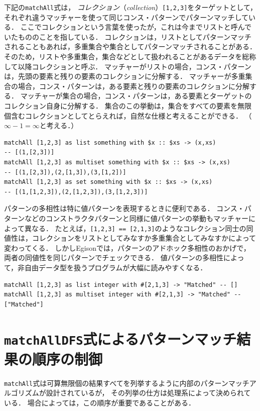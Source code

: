 下記の\lstinline{matchAll}式は， \emph{コレクション}（\emph{collection}）\lstinline{[1,2,3]}をターゲットとして，それぞれ違うマッチャーを使って同じコンス・パターンでパターンマッチしている．
ここでコレクションという言葉を使ったが，これは今までリストと呼んでいたもののことを指している．
コレクションは，リストとしてパターンマッチされることもあれば，多重集合や集合としてパターンマッチされることがある．
そのため，リストや多重集合，集合などとして扱われることがあるデータを総称して以降コレクションと呼ぶ．
マッチャーがリストの場合，コンス・パターンは，先頭の要素と残りの要素のコレクションに分解する．
マッチャーが多重集合の場合，コンス・パターンは，ある要素と残りの要素のコレクションに分解する．
マッチャーが集合の場合，コンス・パターンは，ある要素とターゲットのコレクション自身に分解する．
集合のこの挙動は，集合をすべての要素を無限個含むコレクションとしてとらえれば，自然な仕様と考えることができる．
（$\infty - 1 = \infty$と考える．）
\begin{lstlisting}[language=egison,numbers=none]
matchAll [1,2,3] as list something with $x :: $xs -> (x,xs)
-- [(1,[2,3])]
matchAll [1,2,3] as multiset something with $x :: $xs -> (x,xs)
-- [(1,[2,3]),(2,[1,3]),(3,[1,2])]
matchAll [1,2,3] as set something with $x :: $xs -> (x,xs)
-- [(1,[1,2,3]),(2,[1,2,3]),(3,[1,2,3])]
\end{lstlisting}

パターンの多相性は特に値パターンを表現するときに便利である．
コンス・パターンなどのコンストラクタパターンと同様に値パターンの挙動もマッチャーによって異なる．
たとえば，\lstinline{[1,2,3] == [2,1,3]}のようなコレクション同士の同値性は，コレクションをリストとしてみなすか多重集合としてみなすかによって変わってくる．
しかしEgisonでは，パターンのアドホック多相性のおかげで，両者の同値性を同じパターンでチェックできる．
値パターンの多相性によって，非自由データ型を扱うプログラムが大幅に読みやすくなる．
\begin{lstlisting}[language=egison,numbers=none]
matchAll [1,2,3] as list integer with #[2,1,3] -> "Matched" -- []
matchAll [1,2,3] as multiset integer with #[2,1,3] -> "Matched" -- ["Matched"]
\end{lstlisting}

\section{\texttt{matchAllDFS}式によるパターンマッチ結果の順序の制御}\label{quick-matchalldfs}

\lstinline{matchAll}式は可算無限個の結果すべてを列挙するように内部のパターンマッチアルゴリズムが設計されているが，
その列挙の仕方は処理系によって決められている．
場合によっては，この順序が重要であることがある．

